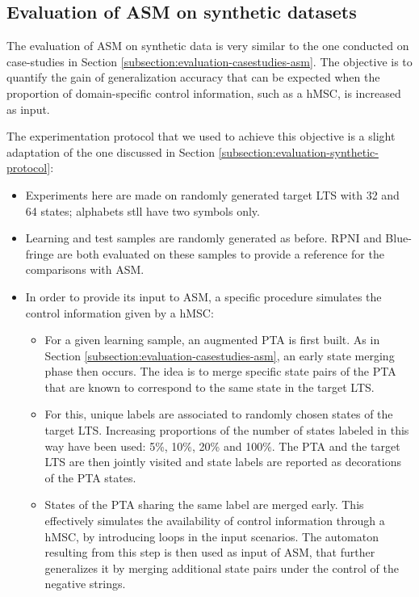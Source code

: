 \subsection{Evaluation of ASM on synthetic datasets\label{subsection:evaluation-synthetic-asm}}

The evaluation of ASM on synthetic data is very similar to the one conducted on case-studies in Section \ref{subsection:evaluation-casestudies-asm}. The objective is to quantify the gain of generalization accuracy that can be expected when the proportion of domain-specific control information, such as a hMSC, is increased as input. 

The experimentation protocol that we used to achieve this objective is a slight adaptation of the one discussed in Section \ref{subsection:evaluation-synthetic-protocol}:
\begin{itemize}
\item Experiments here are made on randomly generated target LTS with 32 and 64 states; alphabets stll have two symbols only.
\item Learning and test samples are randomly generated as before. RPNI and Blue-fringe are both evaluated on these samples to provide a reference for the comparisons with ASM.  
\item In order to provide its input to ASM, a specific procedure simulates the control information given by a hMSC:
\begin{itemize}
\item For a given learning sample, an augmented PTA is first built. As in Section \ref{subsection:evaluation-casestudies-asm}, an early state merging phase then occurs. The idea is to merge specific state pairs of the PTA that are known to correspond to the same state in the target LTS.
\item For this, unique labels are associated to randomly chosen states of the target LTS. Increasing proportions of the number of states labeled in this way have been used: 5\%, 10\%, 20\% and 100\%. The PTA and the target LTS are then jointly visited and state labels are reported as decorations of the PTA states. 
\item States of the PTA sharing the same label are merged early. This effectively simulates the availability of control information through a hMSC, by introducing loops in the input scenarios. The automaton resulting from this step is then used as input of ASM, that further generalizes it by merging additional state pairs under the control of the negative strings.
\end{itemize}
\end{itemize}
 

